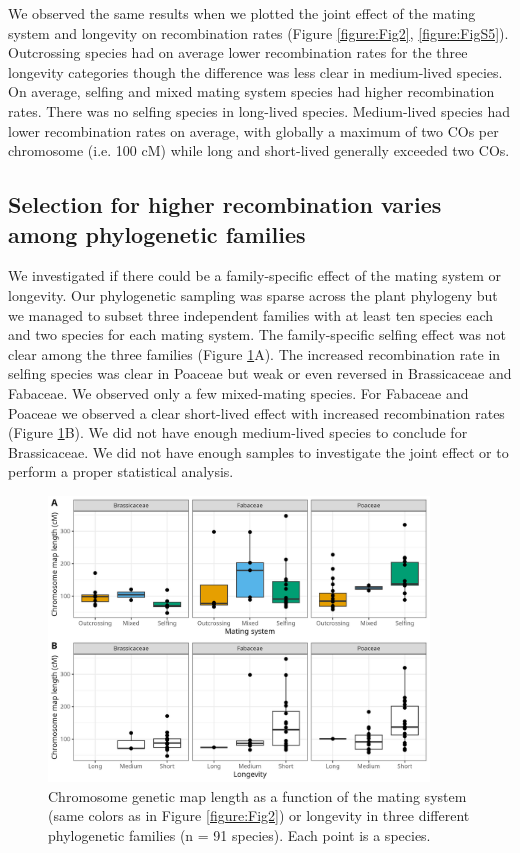 \documentclass{article}
\begin{document}
We observed the same results when we plotted the joint effect of the mating system and longevity on recombination rates (Figure \ref{figure:Fig2}, \ref{figure:FigS5}). Outcrossing species had on average lower recombination rates for the three longevity categories though the difference was less clear in medium-lived species. On average, selfing and mixed mating system species had higher recombination rates. There was no selfing species in long-lived species. Medium-lived species had lower recombination rates on average, with globally a maximum of two COs per chromosome (i.e. 100 cM) while long and short-lived generally exceeded two COs.


\subsection*{Selection for higher recombination varies among phylogenetic families}


We investigated if there could be a family-specific effect of the mating system or longevity. Our phylogenetic sampling was sparse across the plant phylogeny but we managed to subset three independent families with at least ten species each and two species for each mating system. The family-specific selfing effect was not clear among the three families (Figure \ref{figure:Fig3}A). The increased recombination rate in selfing species was clear in Poaceae but weak or even reversed in Brassicaceae and Fabaceae. We observed only a few mixed-mating species. For Fabaceae and Poaceae we observed a clear short-lived effect with increased recombination rates (Figure \ref{figure:Fig3}B). We did not have enough medium-lived species to conclude for Brassicaceae. We did not have enough samples to investigate the joint effect or to perform a proper statistical analysis.



\begin{figure}[h!]
  \includegraphics[width=0.9\textwidth]{figures/Fig3.jpeg}
  \centering
  \caption{Chromosome genetic map length as a function of the mating system (same colors as in Figure \ref{figure:Fig2}) or longevity in three different phylogenetic families (n = 91 species). Each point is a species.
  }
  \label{figure:Fig3}
\end{figure}
\end{document}
